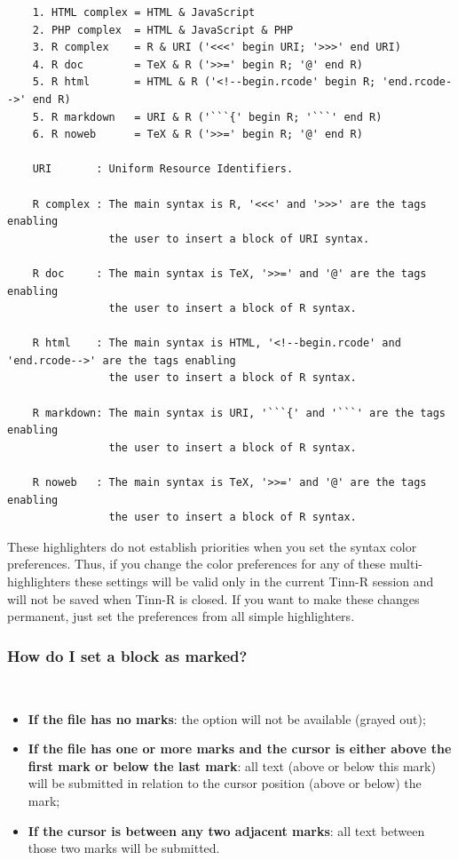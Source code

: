 \begin{footnotesize}
  \begin{verbatim}
    1. HTML complex = HTML & JavaScript
    2. PHP complex  = HTML & JavaScript & PHP
    3. R complex    = R & URI ('<<<' begin URI; '>>>' end URI)
    4. R doc        = TeX & R ('>>=' begin R; '@' end R)
    5. R html       = HTML & R ('<!--begin.rcode' begin R; 'end.rcode-->' end R)
    5. R markdown   = URI & R ('```{' begin R; '```' end R)
    6. R noweb      = TeX & R ('>>=' begin R; '@' end R)

    URI       : Uniform Resource Identifiers.

    R complex : The main syntax is R, '<<<' and '>>>' are the tags enabling
                the user to insert a block of URI syntax.

    R doc     : The main syntax is TeX, '>>=' and '@' are the tags enabling
                the user to insert a block of R syntax.

    R html    : The main syntax is HTML, '<!--begin.rcode' and 'end.rcode-->' are the tags enabling
                the user to insert a block of R syntax.

    R markdown: The main syntax is URI, '```{' and '```' are the tags enabling
                the user to insert a block of R syntax.

    R noweb   : The main syntax is TeX, '>>=' and '@' are the tags enabling
                the user to insert a block of R syntax.

  \end{verbatim}
\end{footnotesize}

These highlighters do not establish priorities when you set the syntax color
preferences. Thus, if you change the color preferences for any of these
multi-highlighters these settings will be valid only
in the current Tinn-R session and will not be saved when Tinn-R is closed.
If you want to make these changes permanent, just set the  preferences
from all simple highlighters.


\subsubsection{How do I set a block as marked?}\\

\begin{itemize}
  \item \textbf{If the file has no marks}: the option will not be
    available (grayed out);
  \item \textbf{If the file has one or more marks and the cursor
      is either above the first mark or below  the last mark}:
    all text (above or below this mark) will be submitted in
    relation to the cursor position (above or below) the mark;
  \item \textbf{If the cursor is between any two adjacent marks}:
    all text between those two marks will be submitted.
\end{itemize}


